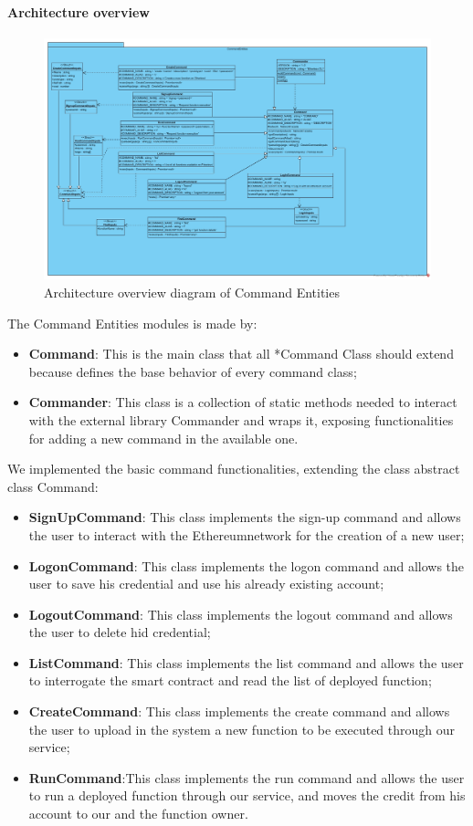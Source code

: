 \paragraph{Architecture overview}
\begin{figure}[h]
	\centering
	\includegraphics[width=\textwidth]{./res/img/Etherless-cli_commandEntities.jpg}
	\caption{Architecture overview diagram of Command Entities}
\end{figure}
\noindent The Command Entities modules is made by:
\begin{itemize}
    \item \textbf{Command}: This is the main class that all *Command Class should extend because defines the base behavior of every command class;
    \item \textbf{Commander}: This class is a collection of static methods needed to interact with the external library Commander and wraps it, exposing functionalities for adding a new command in the available one.
\end{itemize}
We implemented the basic command functionalities, extending the class abstract class Command:
\begin{itemize}
    \item \textbf{SignUpCommand}: This class implements the sign-up command and allows the user to interact with the Ethereum\glo network for the creation of a new user;
    \item \textbf{LogonCommand}: This class implements the logon command and allows the user to save his credential and use his already existing account;
    \item \textbf{LogoutCommand}: This class implements the logout command and allows the user to delete hid credential;
    \item \textbf{ListCommand}: This class implements the list command and allows the user to interrogate the smart contract and read the list of deployed function;
    \item \textbf{CreateCommand}: This class implements the create command and allows the user to upload in the system a new function to be executed through our service;
    \item \textbf{RunCommand}:This class implements the run command and allows the user to run a deployed function through our service, and moves the credit from his account to our and the function owner.
\end{itemize}
